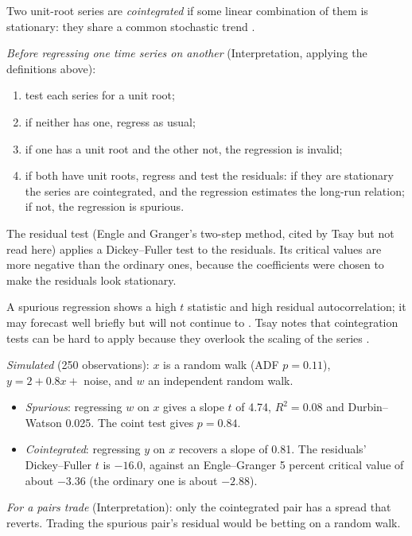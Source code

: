 \begin{qfmethod}\label{meth:cointegration-testing}
 Two unit-root series are \emph{cointegrated} if some linear combination of them is stationary: they share a common stochastic trend \citep[pp.~428--430]{s7-tsay}.

\emph{Before regressing one time series on another} (Interpretation, applying the definitions above):
\begin{enumerate}
\item test each series for a unit root;
\item if neither has one, regress as usual;
\item if one has a unit root and the other not, the regression is invalid;
\item if both have unit roots, regress and test the residuals: if they are stationary the series are cointegrated, and the regression estimates the long-run relation; if not, the regression is spurious.
\end{enumerate}
The residual test (Engle and Granger's two-step method, cited by Tsay but not read here) applies a Dickey--Fuller test to the residuals. Its critical values are more negative than the ordinary ones, because the coefficients were chosen to make the residuals look stationary.

A spurious regression shows a high $t$ statistic and high residual autocorrelation; it may forecast well briefly but will not continue to \citep[sec.~7.5]{s7-hyndman}. Tsay notes that cointegration tests can be hard to apply because they overlook the scaling of the series \citep[pp.~430--431]{s7-tsay}.

 \emph{Simulated} (250 observations): $x$ is a random walk (ADF $p=0.11$), $y=2+0.8x+$ noise, and $w$ an independent random walk.
\begin{itemize}
\item \emph{Spurious}: regressing $w$ on $x$ gives a slope $t$ of 4.74, $R^2=0.08$ and Durbin--Watson 0.025. The coint test gives $p=0.84$.
\item \emph{Cointegrated}: regressing $y$ on $x$ recovers a slope of 0.81. The residuals' Dickey--Fuller $t$ is $-16.0$, against an Engle--Granger 5 percent critical value of about $-3.36$ (the ordinary one is about $-2.88$).
\end{itemize}
\emph{For a pairs trade} (Interpretation): only the cointegrated pair has a spread that reverts. Trading the spurious pair's residual would be betting on a random walk.


\end{qfmethod}

